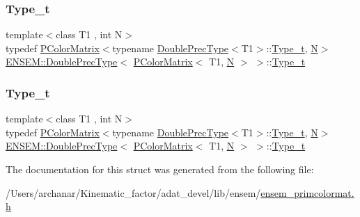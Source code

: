 \subsubsection{\texorpdfstring{Type\_t}{Type\_t}\hspace{0.1cm}{\footnotesize\ttfamily [1/2]}}
{\footnotesize\ttfamily template$<$class T1 , int N$>$ \\
typedef \mbox{\hyperlink{classENSEM_1_1PColorMatrix}{P\+Color\+Matrix}}$<$typename \mbox{\hyperlink{structENSEM_1_1DoublePrecType}{Double\+Prec\+Type}}$<$T1$>$\+::\mbox{\hyperlink{structENSEM_1_1DoublePrecType_3_01PColorMatrix_3_01T1_00_01N_01_4_01_4_ad34f205ddad59c047cf49ac9972cdaeb}{Type\+\_\+t}}, \mbox{\hyperlink{operator__name__util_8cc_a7722c8ecbb62d99aee7ce68b1752f337}{N}}$>$ \mbox{\hyperlink{structENSEM_1_1DoublePrecType}{E\+N\+S\+E\+M\+::\+Double\+Prec\+Type}}$<$ \mbox{\hyperlink{classENSEM_1_1PColorMatrix}{P\+Color\+Matrix}}$<$ T1, \mbox{\hyperlink{operator__name__util_8cc_a7722c8ecbb62d99aee7ce68b1752f337}{N}} $>$ $>$\+::\mbox{\hyperlink{structENSEM_1_1DoublePrecType_3_01PColorMatrix_3_01T1_00_01N_01_4_01_4_ad34f205ddad59c047cf49ac9972cdaeb}{Type\+\_\+t}}}

\mbox{\label{structENSEM_1_1DoublePrecType_3_01PColorMatrix_3_01T1_00_01N_01_4_01_4_ad34f205ddad59c047cf49ac9972cdaeb}} 
\subsubsection{\texorpdfstring{Type\_t}{Type\_t}\hspace{0.1cm}{\footnotesize\ttfamily [2/2]}}
{\footnotesize\ttfamily template$<$class T1 , int N$>$ \\
typedef \mbox{\hyperlink{classENSEM_1_1PColorMatrix}{P\+Color\+Matrix}}$<$typename \mbox{\hyperlink{structENSEM_1_1DoublePrecType}{Double\+Prec\+Type}}$<$T1$>$\+::\mbox{\hyperlink{structENSEM_1_1DoublePrecType_3_01PColorMatrix_3_01T1_00_01N_01_4_01_4_ad34f205ddad59c047cf49ac9972cdaeb}{Type\+\_\+t}}, \mbox{\hyperlink{operator__name__util_8cc_a7722c8ecbb62d99aee7ce68b1752f337}{N}}$>$ \mbox{\hyperlink{structENSEM_1_1DoublePrecType}{E\+N\+S\+E\+M\+::\+Double\+Prec\+Type}}$<$ \mbox{\hyperlink{classENSEM_1_1PColorMatrix}{P\+Color\+Matrix}}$<$ T1, \mbox{\hyperlink{operator__name__util_8cc_a7722c8ecbb62d99aee7ce68b1752f337}{N}} $>$ $>$\+::\mbox{\hyperlink{structENSEM_1_1DoublePrecType_3_01PColorMatrix_3_01T1_00_01N_01_4_01_4_ad34f205ddad59c047cf49ac9972cdaeb}{Type\+\_\+t}}}



The documentation for this struct was generated from the following file\+:\begin{DoxyCompactItemize}
\item 
/\+Users/archanar/\+Kinematic\+\_\+factor/adat\+\_\+devel/lib/ensem/\mbox{\hyperlink{lib_2ensem_2ensem__primcolormat_8h}{ensem\+\_\+primcolormat.\+h}}\end{DoxyCompactItemize}
